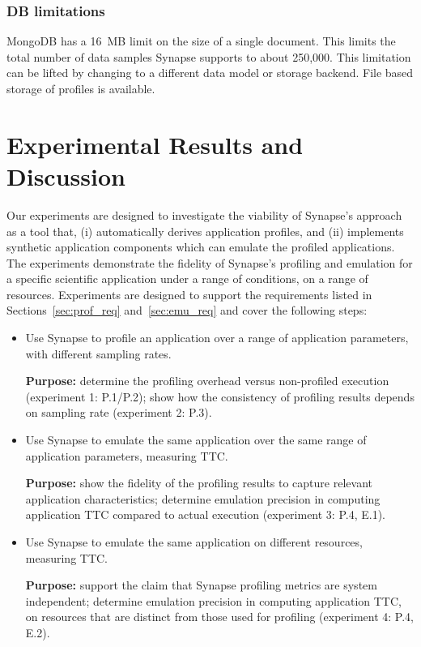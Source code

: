 \documentclass[10pt, conference, compsocconf]{IEEEtran}
\newcommand{\B}[1]{\textbf{#1}\xspace}
\newcommand{\synapse}{Synapse\xspace}
\begin{document}
 \subsubsection{DB limitations}  MongoDB has a 16~MB limit on the size of
 a single document.  This limits the total number of data samples
 \synapse supports to about 250,000.  This limitation can be lifted by
 changing to a different data model or storage backend.  File based
 storage of profiles is available.


\section{Experimental Results and Discussion} 
\label{sec:exp}

Our experiments are designed to investigate the viability of \synapse's approach
as a tool that, (i) automatically derives application profiles, and (ii)
implements synthetic application components which can emulate the profiled
applications.  The experiments demonstrate the fidelity of \synapse's profiling
and emulation for a specific scientific application under a range of conditions,
on a range of resources. Experiments are designed to support the requirements
listed in Sections~\ref{sec:prof_req} and~\ref{sec:emu_req} and cover the
following steps:





 \begin{itemize}
  
  \item Use \synapse to profile an application over a range of
      application parameters, with different sampling rates.

      \B{Purpose:} determine the profiling overhead versus
      non-profiled execution (experiment 1: P.1/P.2); show how the
      consistency of profiling results depends on sampling rate
      (experiment 2: P.3).

  \item Use \synapse to emulate the same application over the same
      range of application parameters, measuring TTC.

      \B{Purpose:} show the fidelity of the profiling results to capture
      relevant application characteristics; determine emulation precision in
      computing application TTC compared to actual execution (experiment 3: P.4,
      E.1).

  \item Use \synapse to emulate the same application on different
      resources, measuring TTC.
      
      \B{Purpose:} support the claim that \synapse profiling metrics are system
      independent; determine emulation precision in computing application TTC,
      on resources that are distinct from those used for profiling (experiment 4: P.4, E.2).

 \end{itemize}
\end{document}
